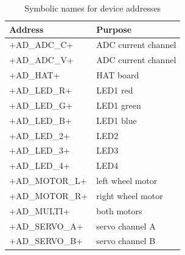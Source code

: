 \documentclass[11pt,fleqn]{article}
\begin{document}
\begin{table}[h]
\centering
\begin{tabular}{|l|l|} \hline
Address & Purpose \\ \hline\hline
+AD_ADC_C+ & ADC current channel \\
+AD_ADC_V+ & ADC current channel \\ \hline
+AD_HAT+ & HAT board \\ \hline
+AD_LED_R+ & LED1 red \\
+AD_LED_G+ & LED1 green \\
+AD_LED_B+ & LED1 blue \\
+AD_LED_2+ & LED2 \\
+AD_LED_3+ & LED3 \\
+AD_LED_4+ & LED4 \\ \hline
+AD_MOTOR_L+ & left wheel motor \\ 
+AD_MOTOR_R+ & right wheel motor \\ \hline
+AD_MULTI+ & both motors \\ \hline
+AD_SERVO_A+ & servo channel A \\
+AD_SERVO_B+ & servo channel B \\ \hline
\end{tabular}
\caption{Symbolic names for device addresses}\label{tab:devices}
\end{table}



\end{document}
